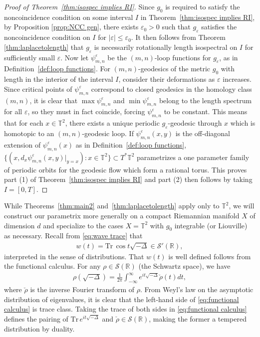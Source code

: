 \documentclass[11pt,letterpaper,oneside]{amsart}
\newcommand{\R}{\mathbb{R}}
\newcommand{\T}{\mathbb{T}}
\theoremstyle{definition}
\theoremstyle{remark}
\newcommand{\eps}{\varepsilon}
\newcommand{\tr}{\text{Tr}\,}
\theoremstyle{definition}
\theoremstyle{remark}
\begin{document}
\begin{proof}[Proof of Theorem~\ref{thm:isospec implies RI}]
    Since $g_0$ is required to satisfy the noncoincidence condition on some interval $I$ in Theorem~\ref{thm:isospec implies RI}, by Proposition \ref{prop:NCC gen}, there exists $\eps_0 > 0$ such that  $g_\eps$ satisfies the noncoincidence condition on $I$ for $|\eps| \leq \eps_0$. 
    It then follows from Theorem \ref{thm:laplacetolength} that $g_\eps$ is necessarily rotationally length isospectral on $I$ for sufficiently small $\eps$. Now let $\psi_{m,n}^\eps$ be the $(m,n)$-loop functions for $g_\eps$, as in Definition~\ref{def:loop functions}. For $(m,n)$-geodesics of the metric $g_0$ with length in the interior of the interval $I$, consider their deformations as $\eps$ increases. Since critical points of $\psi_{m,n}^\eps$ correspond to closed geodesics in the homology class $(m,n)$, it is clear that $\max \psi_{m,n}^\eps$ and $\min \psi_{m,n}^\eps$ belong to the length spectrum for all $\eps$, so they must in fact coincide, forcing $\psi_{m,n}^\eps$ to be constant. This means that for each $x \in \T^2$, there exists a unique periodic $g_\eps$-geodesic through $x$ which is homotopic to an $(m,n)$-geodesic loop. If $\psi_{m,n}^\eps(x,y)$ is the off-diagonal extension of $\psi_{m,n}^\eps(x)$ as in Definition~\ref{def:loop functions}, $\{(x,d_x \psi_{m,n}^\eps(x,y)|_{y = x} ): x \in \T^2\} \subset T^*\T^2$ parametrizes a one parameter family of periodic orbits for the geodesic flow which form a rational torus. This proves part (1) of Theorem~\ref{thm:isospec implies RI} and part (2) then follows by taking $I = [0,T]$.
\end{proof}

While Theorems~\ref{thm:main2} and~\ref{thm:laplacetolength} apply only to $\T^2$, we will construct our parametrix more generally on a compact Riemannian manifold $X$ of dimension $d$ and specialize to the cases $X = \T^2$ with $g_0$ integrable (or Liouville) as necessary. Recall from \eqref{eq:wave trace} that
\begin{align*}
    w(t) = \tr \cos t \sqrt{-\Delta} \in \mathscr{S}'(\R),
\end{align*}
interpreted in the sense of distributions. That $w(t)$ is well defined follows from the functional calculus. For any $\rho \in \mathscr{S}(\R)$ (the Schwartz space), we have
\begin{align}\label{eq:functional calculus}
    \rho(\sqrt{-\Delta}) = \frac{1}{2\pi} \int_{-\infty}^{\infty} e^{i t \sqrt{-\Delta}} \check{\rho}(t) dt,
\end{align}
where $\check{\rho}$ is the inverse Fourier transform of $\rho$. From Weyl's law on the asymptotic distribution of eigenvalues, it is clear that the left-hand side of \eqref{eq:functional calculus} is trace class. Taking the trace of both sides in \eqref{eq:functional calculus} defines the pairing of $\tr e^{i t \sqrt{-\Delta}}$ and $\check{\rho} \in \mathscr{S}(\R)$, making the former a tempered distribution by duality.
\end{document}
